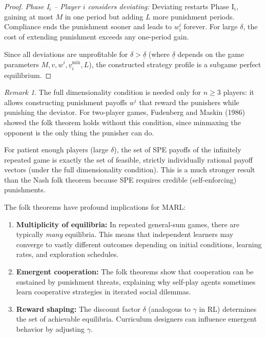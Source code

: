 \documentclass[11pt,a4paper]{article}
\theoremstyle{definition}
\theoremstyle{plain}
\theoremstyle{remark}
\newtheorem{remark}{Remark}[section]
\begin{document}
\begin{proof}
\emph{Phase I$_i$ -- Player $i$ considers deviating:}
Deviating restarts Phase I$_i$, gaining at most $M$ in one period but adding $L$ more
punishment periods. Compliance ends the punishment sooner and leads to $w^i_i$ forever.
For large $\delta$, the cost of extending punishment exceeds any one-period gain.

Since all deviations are unprofitable for $\delta > \underline{\delta}$ (where
$\underline{\delta}$ depends on the game parameters $M, v, w^i,
\underline{v}_i^{\text{mix}}, L$), the constructed strategy profile is a subgame perfect
equilibrium.
\end{proof}

\begin{remark}
The full dimensionality condition is needed only for $n \geq 3$ players: it allows
constructing punishment payoffs $w^i$ that reward the punishers while punishing the
deviator. For two-player games, Fudenberg and Maskin (1986) showed the folk theorem holds
without this condition, since minmaxing the opponent is the only thing the punisher can do.
\end{remark}

\begin{keyresult}
For patient enough players (large $\delta$), the set of SPE payoffs of the infinitely
repeated game is exactly the set of feasible, strictly individually rational payoff
vectors (under the full dimensionality condition). This is a much stronger result than the
Nash folk theorem because SPE requires credible (self-enforcing) punishments.
\end{keyresult}

\begin{rlconnection}
The folk theorems have profound implications for MARL:
\begin{enumerate}[label=(\roman*)]
    \item \textbf{Multiplicity of equilibria:} In repeated general-sum games, there are
    typically \emph{many} equilibria. This means that independent learners may converge to
    vastly different outcomes depending on initial conditions, learning rates, and
    exploration schedules.
    \item \textbf{Emergent cooperation:} The folk theorems show that cooperation can be
    sustained by punishment threats, explaining why self-play agents sometimes learn
    cooperative strategies in iterated social dilemmas.
    \item \textbf{Reward shaping:} The discount factor $\delta$ (analogous to $\gamma$ in
    RL) determines the set of achievable equilibria. Curriculum designers can influence
    emergent behavior by adjusting $\gamma$.
\end{enumerate}
\end{rlconnection}
\end{document}
